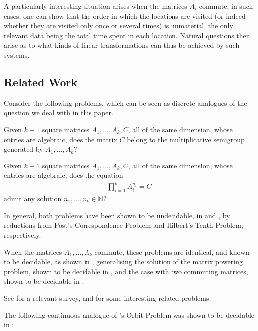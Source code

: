 A particularly interesting situation arises when the matrices $A_i$
commute; in such cases, one can show that the order in which the
locations are visited (or indeed whether they are visited only once or
several times) is immaterial, the only relevant data being the total
time spent in each location. Natural questions then arise as to what
kinds of linear transformations can thus be achieved by such systems.

\subsection{Related Work}

Consider the following problems, which can be seen as discrete analogues of the question we deal with in this paper.

\begin{definition}
Given $k+1$ square matrices $A_{1}, \ldots, A_{k}, C$, all of the same dimension, whose entries are algebraic, does the matrix $C$ belong to the multiplicative semigroup generated by $A_{1}, \ldots, A_{k}$?
\end{definition}

\begin{definition}
Given $k+1$ square matrices $A_{1}, \ldots, A_{k}, C$, all of the same dimension, whose entries are algebraic, does the equation
\begin{align*}
\prod\limits_{i=1}^{k} A_{i}^{n_{i}} = C
\end{align*}
admit any solution $n_{1}, \ldots, n_{k} \in \mathbb{N}$?
\end{definition}

In general, both problems have been shown to be undecidable, in
\cite{Paterson} and \cite{MEHTP}, by reductions from Post's
Correspondence Problem and Hilbert's Tenth Problem, respectively.

When the matrices $A_{1}, \ldots, A_{k}$ commute, these problems are
identical, and known to be decidable, as shown in
\cite{MultiplicativeMatrixEquations}, generalising the solution of the
matrix powering problem, shown to be decidable in \cite{KL}, and the
case with two commuting matrices, shown to be decidable in \cite{ABC}.

See \cite{HalavaSurvey} for a relevant survey, and \cite{CK05} for
some interesting related problems.

The following continuous analogue of \cite{KL}'s Orbit Problem was
shown to be decidable in \cite{Hainry}:


